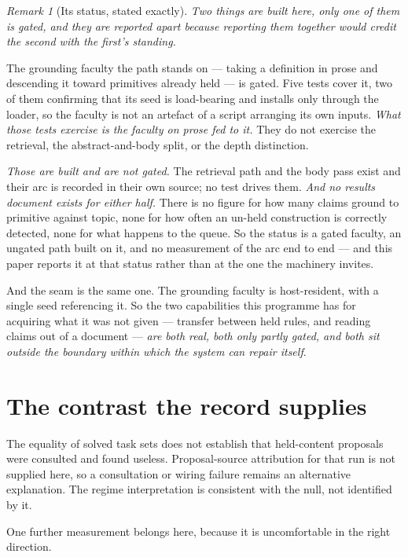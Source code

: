 \documentclass[11pt,a4paper]{article}
\theoremstyle{remark}
\newtheorem{remark}[definition]{Remark}
\begin{document}
\begin{remark}[Its status, stated exactly]\label{rem:reading-status}
\emph{Two things are built here, only one of them is gated, and they are reported apart because
reporting them together would credit the second with the first's standing.}

The grounding faculty the path stands on --- taking a definition in prose and descending it toward
primitives already held --- is gated. Five tests cover it, two of them confirming that its seed is
load-bearing and installs only through the loader, so the faculty is not an artefact of a script
arranging its own inputs. \emph{What those tests exercise is the faculty on prose fed to it.} They do
not exercise the retrieval, the abstract-and-body split, or the depth distinction.

\emph{Those are built and are not gated.} The retrieval path and the body pass exist and their arc is
recorded in their own source; no test drives them. \emph{And no results document exists for either
half.} There is no figure for how many claims ground to primitive against topic, none for how often an
un-held construction is correctly detected, none for what happens to the queue. So the status is a
gated faculty, an ungated path built on it, and no measurement of the arc end to end --- and this paper
reports it at that status rather than at the one the machinery invites.

And the seam is the same one. The grounding faculty is host-resident, with a single seed referencing
it. So the two capabilities this programme has for acquiring what it was not given --- transfer between
held rules, and reading claims out of a document --- \emph{are both real, both only partly gated, and
both sit outside the boundary within which the system can repair itself}.
\end{remark}

\section{The contrast the record supplies}\label{sec:contrast}
The equality of solved task sets does not establish that held-content proposals
were consulted and found useless. Proposal-source attribution for that run is
not supplied here, so a consultation or wiring failure remains an alternative
explanation. The regime interpretation is consistent with the null, not
identified by it.

One further measurement belongs here, because it is uncomfortable in the right direction.
\end{document}
